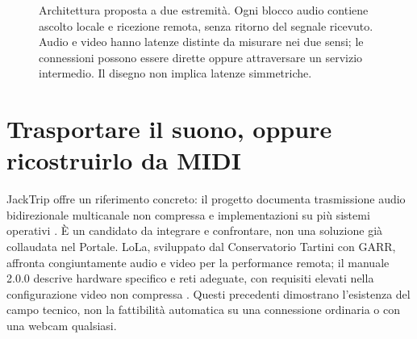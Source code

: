 \begin{figure}[htbp]
\centering
{}
\caption{Architettura proposta a due estremità. Ogni blocco audio
contiene ascolto locale e ricezione remota, senza ritorno del segnale
ricevuto. Audio e video hanno latenze distinte da misurare nei due
sensi; le connessioni possono essere dirette oppure attraversare
un servizio intermedio. Il disegno non implica latenze simmetriche.}
\label{fig:engineering-architecture}
\end{figure}

\section{Trasportare il suono, oppure ricostruirlo da MIDI}

JackTrip offre un riferimento concreto: il progetto documenta
trasmissione audio bidirezionale multicanale non compressa e
implementazioni su più sistemi operativi \cite{net_jacktrip}.
È un candidato da integrare e confrontare, non una soluzione già
collaudata nel Portale. LoLa, sviluppato dal Conservatorio Tartini
con GARR, affronta congiuntamente audio e video per la performance
remota; il manuale 2.0.0 descrive hardware specifico e reti adeguate,
con requisiti elevati nella configurazione video non compressa
\cite{net_lola_manual}. Questi precedenti dimostrano l'esistenza del
campo tecnico, non la fattibilità automatica su una connessione
ordinaria o con una webcam qualsiasi.

